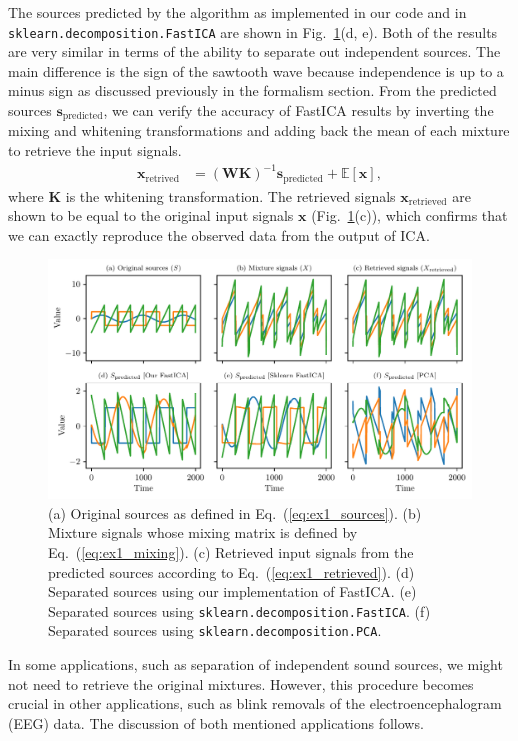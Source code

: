 \documentclass[aps,prl,preprint,superscriptaddress]{revtex4-2}
\begin{document}
The sources predicted by the algorithm as implemented in our code and in \lstinline{sklearn.decomposition.FastICA} are shown in Fig.~\ref{fig:ex1_sources}(d, e).
Both of the results are very similar in terms of the ability to separate out independent sources.
The main difference is the sign of the sawtooth wave because independence is up to a minus sign as discussed previously in the formalism section.
From the predicted sources $\mathbf{s}_{\mathrm{predicted}}$, we can verify the accuracy of FastICA results by inverting the mixing and whitening transformations and adding back the mean of each mixture to retrieve the input signals.
\begin{align}
\mathbf{x}_{\mathrm{retrived}} &= (\mathbf{W} \mathbf{K})^{-1} \mathbf{s}_{\mathrm{predicted}} + \mathbb{E}[\mathbf{x}], \label{eq:ex1_retrieved}
\end{align}
where $\mathbf{K}$ is the whitening transformation.
The retrieved signals $\mathbf{x}_{\mathrm{retrieved}}$ are shown to be equal to the original input signals $\mathbf{x}$ (Fig.~\ref{fig:ex1_sources}(c)), which confirms that we can exactly reproduce the observed data from the output of ICA.
\begin{figure}
\includegraphics{scripts/ex1_sources.pdf}
\caption{\label{fig:ex1_sources}
(a) Original sources as defined in Eq.~(\ref{eq:ex1_sources}).
(b) Mixture signals whose mixing matrix is defined by Eq.~(\ref{eq:ex1_mixing}).
(c) Retrieved input signals from the predicted sources according to Eq.~(\ref{eq:ex1_retrieved}).
(d) Separated sources using our implementation of FastICA.
(e) Separated sources using \lstinline{sklearn.decomposition.FastICA}.
(f) Separated sources using \lstinline{sklearn.decomposition.PCA}.
}
\end{figure}
In some applications, such as separation of independent sound sources, we might not need to retrieve the original mixtures.
However, this procedure becomes crucial in other applications, such as blink removals of the electroencephalogram (EEG) data. The discussion of both mentioned applications follows.
\end{document}

